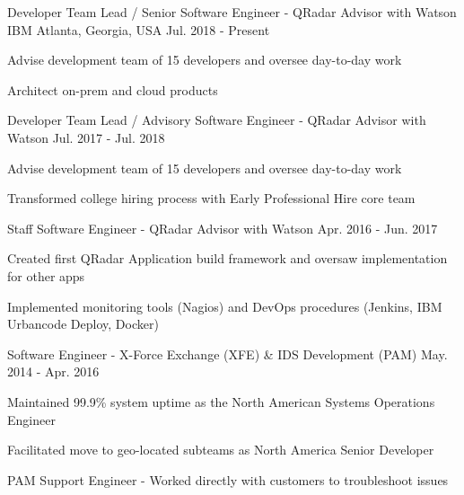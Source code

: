 
\begin{cventries}

  \cventry
    {Developer Team Lead / Senior Software Engineer - QRadar Advisor with Watson} %
    {IBM} %
    {Atlanta, Georgia, USA} %
    {Jul. 2018 - Present} %
    {
      \begin{cvitems}
        \item {Advise development team of 15 developers and oversee day-to-day work}
        \item {Architect on-prem and cloud products}
      \end{cvitems}
    }
    
  \cventry
    {Developer Team Lead / Advisory Software Engineer - QRadar Advisor with Watson} %
    {} %
    {} %
    {Jul. 2017 - Jul. 2018} %
    {
      \begin{cvitems}
        \item {Advise development team of 15 developers and oversee day-to-day work}
        \item {Transformed college hiring process with Early Professional Hire core team}
      \end{cvitems}
    }

  \cventry
    {Staff Software Engineer - QRadar Advisor with Watson}
    {}
    {}
    {Apr. 2016 - Jun. 2017}
    {
      \begin{cvitems}
        \item {Created first QRadar Application build framework and oversaw implementation for other apps}
        \item {Implemented monitoring tools (Nagios) and DevOps procedures (Jenkins, IBM Urbancode Deploy, Docker)}
      \end{cvitems}
    }

  \cventry
    {Software Engineer - X-Force Exchange (XFE) \& IDS Development (PAM)}
    {}
    {}
    {May. 2014 - Apr. 2016}
    {
    \begin{cvitems}
      \item {Maintained 99.9\% system uptime as the North American Systems Operations Engineer}
      \item {Facilitated move to geo-located subteams as North America Senior Developer}
      \item {PAM Support Engineer - Worked directly with customers to troubleshoot issues}
    \end{cvitems}
    }


\end{cventries}

